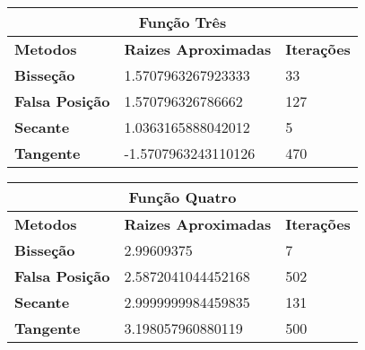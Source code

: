 \documentclass[12pt]{article}
\begin{document}
\begin{table}[]
\begin{tabular}{lll}
\multicolumn{3}{c}{\textbf{Função Três}}                                                                            \\ \hline
\multicolumn{1}{l|}{\textbf{Metodos}}       & \multicolumn{1}{l|}{\textbf{Raizes Aproximadas}} & \textbf{Iterações} \\ \hline
\multicolumn{1}{l|}{\textbf{Bisseção}}      & \multicolumn{1}{l|}{1.5707963267923333}          & 33                 \\ \hline
\multicolumn{1}{l|}{\textbf{Falsa Posição}} & \multicolumn{1}{l|}{1.570796326786662}           & 127                \\ \hline
\multicolumn{1}{l|}{\textbf{Secante}}       & \multicolumn{1}{l|}{1.0363165888042012}          & 5                  \\ \hline
\multicolumn{1}{l|}{\textbf{Tangente}}      & \multicolumn{1}{l|}{-1.5707963243110126}         & 470               
\end{tabular}
\end{table}

\begin{table}[]
\begin{tabular}{lll}
\multicolumn{3}{c}{\textbf{Função Quatro}}                                                                          \\ \hline
\multicolumn{1}{l|}{\textbf{Metodos}}       & \multicolumn{1}{l|}{\textbf{Raizes Aproximadas}} & \textbf{Iterações} \\ \hline
\multicolumn{1}{l|}{\textbf{Bisseção}}      & \multicolumn{1}{l|}{2.99609375}                  & 7                  \\ \hline
\multicolumn{1}{l|}{\textbf{Falsa Posição}} & \multicolumn{1}{l|}{2.5872041044452168}          & 502                \\ \hline
\multicolumn{1}{l|}{\textbf{Secante}}       & \multicolumn{1}{l|}{2.9999999984459835}          & 131                \\ \hline
\multicolumn{1}{l|}{\textbf{Tangente}}      & \multicolumn{1}{l|}{3.198057960880119}           & 500               
\end{tabular}
\end{table}
\end{document}
